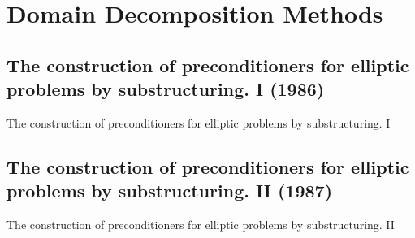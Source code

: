 
%

\chapter{Domain Decomposition Methods}
\section{The construction of preconditioners for elliptic problems by substructuring. I (1986)}
The construction of preconditioners for elliptic problems by substructuring. I \cite{bramble1986construction}


\section{The construction of preconditioners for elliptic problems by substructuring. II (1987)}
The construction of preconditioners for elliptic problems by substructuring. II\cite{bramble1987construction}


